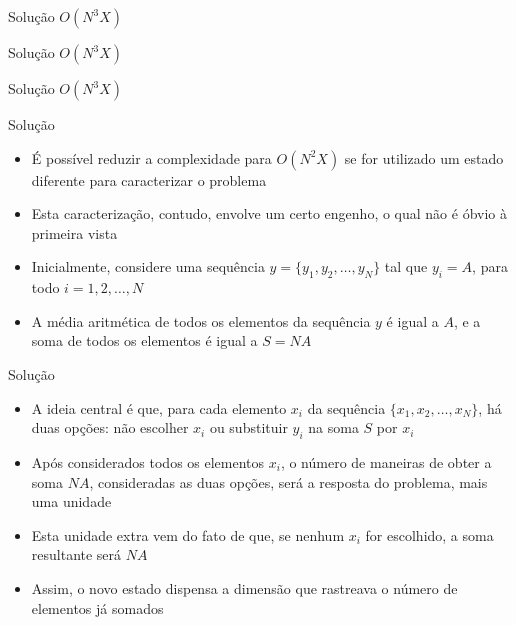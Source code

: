 \begin{frame}[fragile]{Solução $O(N^3X)$}
\end{frame}

\begin{frame}[fragile]{Solução $O(N^3X)$}
\end{frame}

\begin{frame}[fragile]{Solução $O(N^3X)$}
\end{frame}

\begin{frame}[fragile]{Solução}

    \begin{itemize}
        \item É possível reduzir a complexidade para $O(N^2X)$ se for utilizado um estado diferente
            para caracterizar o problema

        \item Esta caracterização, contudo, envolve um certo engenho, o qual não é óbvio à primeira
            vista

        \item Inicialmente, considere uma sequência $y = \{ y_1, y_2, \ldots, y_N \}$ tal que 
            $y_i = A$, para todo $i = 1, 2, \ldots, N$

        \item A média aritmética de todos os elementos da sequência $y$ é igual a $A$, e a soma
            de todos os elementos é igual a $S = NA$
    \end{itemize}

\end{frame}

\begin{frame}[fragile]{Solução}

    \begin{itemize}
        \item A ideia central é que, para cada elemento $x_i$ da sequência $\{ x_1, x_2, \ldots,
            x_N \}$, há duas opções: não escolher $x_i$ ou substituir $y_i$ na soma $S$ por $x_i$

        \item Após considerados todos os elementos $x_i$, o número de maneiras de obter a soma
            $NA$, consideradas as duas opções, será a resposta do problema, mais uma unidade

        \item Esta unidade extra vem do fato de que, se nenhum $x_i$ for escolhido, a soma
            resultante será $NA$

        \item Assim, o novo estado dispensa a dimensão que rastreava o número de elementos já
            somados
    \end{itemize}

\end{frame}

